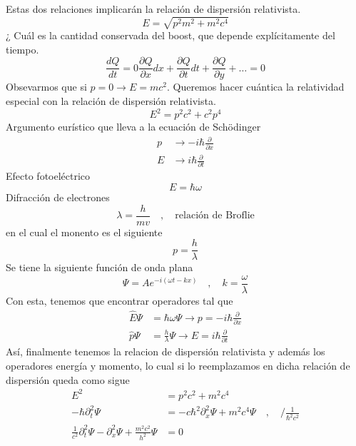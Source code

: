 \documentclass[../main.tex]{subfiles}
\begin{document}
Estas dos relaciones implicarán la relación de dispersión relativista. 
\begin{equation}
  E= \sqrt{p^2m^2 + m^2c^4}
\end{equation}
¿ Cuál es la cantidad conservada del boost, que depende explícitamente del tiempo. 
\begin{equation}
  \frac{dQ}{dt}=0 \frac{\partial Q}{\partial x}dx + \frac{\partial Q}{\partial t}dt + \frac{\partial Q}{\partial y} + \dots = 0
\end{equation}
Obsevarmos que si $p=0 \rightarrow E=mc^2$. Queremos hacer cuántica la relatividad especial con la relación de dispersión relativista.
\begin{equation}
  E^2=p^2c^2 + c^2p^4
\end{equation}
Argumento eurístico que lleva a la ecuación de Schödinger 
\begin{align*}
  p & \rightarrow -i\hbar \frac{\partial}{\partial x} \\
  E & \rightarrow i\hbar\frac{\partial}{\partial t}
\end{align*}
Efecto fotoeléctrico
\begin{equation}
  E=\hbar\omega 
\end{equation}
Difracción de electrones
\begin{equation}
  \lambda = \frac{h}{mv} \quad , \quad \text{relación de Broflie}
\end{equation}
en el cual el monento es el siguiente
\begin{equation}
  p= \frac{h}{\lambda}
\end{equation}
Se tiene la siguiente función de onda plana
\begin{equation}
  \Psi=Ae^{-i(\omega t- kx)} \quad , \quad k=\frac{\omega}{\lambda}
\end{equation}
Con esta, tenemos que encontrar operadores tal que
\begin{align*}
  \hat{E}\Psi  & = \hbar \omega \Psi  \rightarrow   p  = -i\hbar \frac{\partial}{\partial x}\\
  \hat{p}\Psi  & = \frac{h}{\lambda}\Psi \rightarrow  E  = i\hbar \frac{\partial}{\partial t} 
\end{align*}
Así, finalmente tenemos la relacion de dispersión relativista y además los operadores energía y momento, lo cual si lo reemplazamos en dicha relación de dispersión queda como sigue
\begin{align*}
E^2  & = p^2c^2 + m^2c^4 \\
  -\hbar \partial^2_t \Psi & = -c\hbar^2\partial^2_x \Psi + m^2c^4 \Psi \quad, \quad /\frac{1}{\hbar^2c^2}\\  
  \frac{1}{c^2}\partial_t^2\Psi - \partial^2_x \Psi  + \frac{m^2c^2}{h^2}\Psi &= 0
\end{align*}
\end{document}
